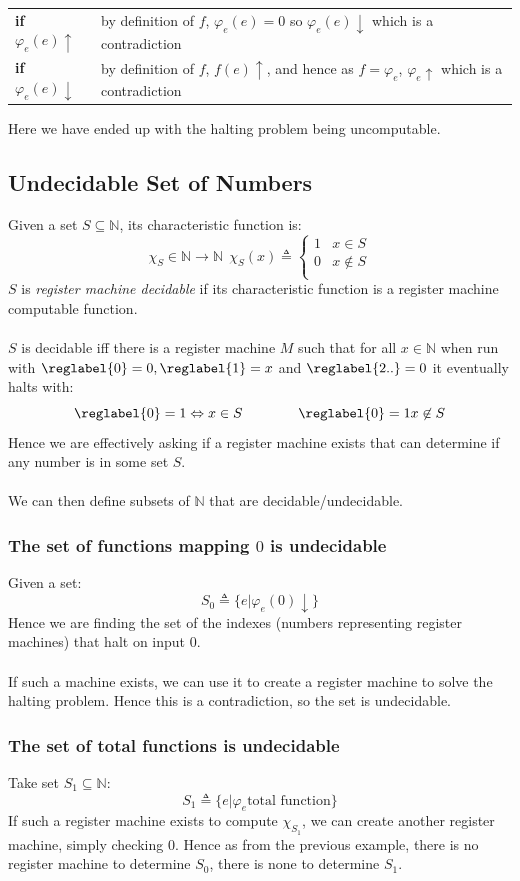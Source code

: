 \begin{center}
    \begin{tabular}{l p{}}
        \textbf{if $\varphi_e(e)\uparrow$} & by definition of $f$, $\varphi_e(e) = 0$ so $\varphi_e(e)\downarrow$ which is a contradiction \\
        \textbf{if $\varphi_e(e)\downarrow$} & by definition of $f$, $f(e)\uparrow$, and hence as $f = \varphi_e$, $\varphi_e\uparrow$ which is a contradiction \\
    \end{tabular}
\end{center}

Here we have ended up with the halting problem being uncomputable.

\subsection{Undecidable Set of Numbers}
Given a set $S \subseteq \mathbb{N}$, its characteristic function is:
\[\chi_S \in \mathbb{N} \to \mathbb{N} \ \ \chi_S(x) \triangleq \begin{cases}
		1 & x \in S     \\
		0 & x \not\in S \\
	\end{cases}\]
$S$ is \textit{register machine decidable} if its characteristic function is a register machine computable function.
\\
\\ $S$ is decidable iff there is a register machine $M$ such that for all $x \in \mathbb{N}$ when run with $\reglabel{0} = 0, \reglabel{1} = x$ and $\reglabel{2..} = 0$ it eventually halts with:
\[\reglabel{0} = 1 \Leftrightarrow x \in S \qquad \qquad \reglabel{0} = 1 x \not\in S \]
Hence we are effectively asking if a register machine exists that can determine if any number is in some set $S$.
\\
\\ We can then define subsets of $\mathbb{N}$ that are decidable/undecidable.

\subsubsection{The set of functions mapping $0$ is undecidable}
Given a set:
\[S_0 \triangleq \{e | \varphi_e(0)\downarrow\}\]
Hence we are finding the set of the indexes (numbers representing register machines) that halt on input $0$.
\\
\\ If such a machine exists, we can use it to create a register machine to solve the halting problem. Hence this is a contradiction, so the set is undecidable.

\subsubsection{The set of total functions is undecidable}
Take set $S_1 \subseteq \mathbb{N}$:
\[S_1 \triangleq \{e | \varphi_e\text{total function}\}\]
If such a register machine exists to compute $\chi_{S_1}$, we can create another register machine, simply checking $0$. Hence as from the previous example, there is no register machine to determine $S_0$, there is none to determine $S_1$.
